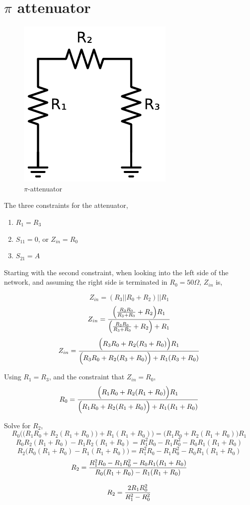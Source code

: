 \documentclass{article}
\begin{document}
\section{$\pi$ attenuator}
\begin{figure}[ht]
    \centering
    \includegraphics[width=0.3\linewidth]{pi_attenuator_fig.pdf}
    \caption{$\pi$-attenuator}
    \label{fig:pi_attenuator}
\end{figure}

The three constraints for the attenuator,
\begin{enumerate}
    \item \(R_1 = R_3\)
    \item \(S_{11} = 0\), or \(Z_{in} = R_0\)
    \item \(S_{21} = A\)
\end{enumerate}

Starting with the second constraint, when looking into the left side of the network, and assuming
the right side is terminated in \(R_0 = 50\Omega\), \(Z_{in}\) is,

\[Z_{in} = (R_3 || R_0 + R_2) || R_1\]
\[Z_{in} = {\Big({R_3 R_0 \over R_3 + R_0} + R_2\Big) R_1 \over \Big({R_3 R_0 \over R_3 + R_0} + R_2\Big) + R_1} \]
\[Z_{in} = {\Big({R_3 R_0} + R_2 (R_3 + R_0)\Big) R_1 \over \Big({R_3 R_0} + R_2 (R_3 + R_0)\Big) + R_1 (R_3 + R_0)} \]

Using \(R_1 = R_3\), and the constraint that \(Z_{in} = R_0\),
\[R_0 = {\Big({R_1 R_0} + R_2 (R_1 + R_0)\Big) R_1 \over \Big({R_1 R_0} + R_2 (R_1 + R_0)\Big) + R_1 (R_1 + R_0)} \]

Solve for \(R_2\),
\[R_0 \Big(\Big({R_1 R_0} + R_2 (R_1 + R_0)\Big) + R_1 (R_1 + R_0)\Big) = {\Big({R_1 R_0} + R_2 (R_1 + R_0)\Big) R_1 } \]
\[R_0  R_2 (R_1 + R_0) - R_1 R_2 (R_1 + R_0)=  {{R_1^2 R_0} } - R_1 R_0^2 - R_0 R_1 (R_1 + R_0)\]
\[ R_2 \Big(R_0 (R_1 + R_0) - R_1 (R_1 + R_0) \Big)=  {{R_1^2 R_0} } - R_1 R_0^2 - R_0 R_1 (R_1 + R_0)\]
\[ R_2 =  {{R_1^2 R_0}  - R_1 R_0^2 - R_0 R_1 (R_1 + R_0) \over R_0 (R_1 + R_0) - R_1 (R_1 + R_0)}\]

\[ R_2 =  { 2R_1 R_0^2 \over R_1^2  - R_0^2 } \]
\end{document}
